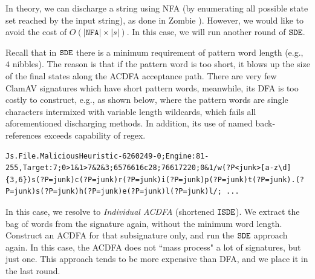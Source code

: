 In theory, we can discharge a string using NFA (by enumerating all possible
state set reached by the input string), as done in Zombie \cite{Zombie23}).
However, we would like to avoid the cost of $O(|\texttt{NFA}| \times |s|)$.
In this case, we will run another round of $\texttt{SDE}$.

Recall that in $\texttt{SDE}$ there is a minimum requirement of pattern word length (e.g., $4$
nibbles). The reason is that if the pattern word is too short, it blows up the
size of the final states along the ACDFA acceptance path. There are very few
ClamAV signatures which have short pattern words, meanwhile, its DFA is
too costly to construct, e.g., as shown below, where
the pattern words are single characters intermixed with variable length
wildcards, which fails all aforementioned discharging methods.
In addition, its use of named back-references exceeds capability
of regex.

\begin{small}
\begin{Verbatim}[breaklines=true, breakanywhere=true]
Js.File.MaliciousHeuristic-6260249-0;Engine:81-255,Target:7;0>1&1>7&2&3;6576616c28;76617220;0&1/w(?P<junk>[a-z\d]{3,6})s(?P=junk)c(?P=junk)r(?P=junk)i(?P=junk)p(?P=junk)t(?P=junk).(?P=junk)s(?P=junk)h(?P=junk)e(?P=junk)l(?P=junk)l/; ... 
\end{Verbatim}
\end{small}

In this case, we resolve to {\em Individual ACDFA \sde} (shortened $\texttt{ISDE}$).
We extract the bag of words from the signature again, without the minimum word length.
Construct an ACDFA for that subsignature only, and run the $\texttt{SDE}$ approach again.
In this case, the ACDFA does not ``mass process" a lot of signatures, but just one.
This approach tends to be more expensive than DFA, and we place it in the last round.


